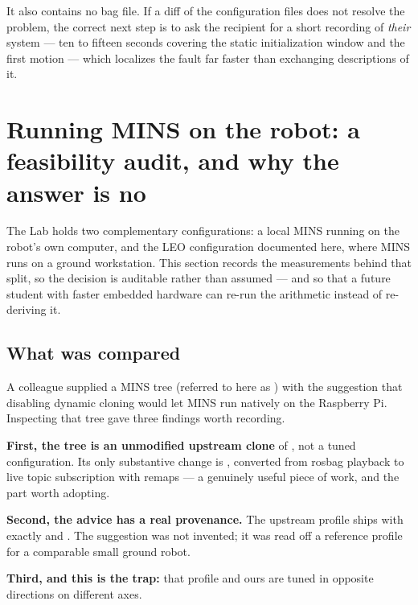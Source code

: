 \noindent It also contains no bag file. If a diff of the configuration files
does not resolve the problem, the correct next step is to ask the recipient for
a short recording of \emph{their} system --- ten to fifteen seconds covering the
static initialization window and the first motion --- which localizes the fault
far faster than exchanging descriptions of it.



\section{Running MINS on the robot: a feasibility audit, and why the answer is no}
\label{ap:mins-embedded}

The Lab holds two complementary configurations: a local MINS running on the
robot's own computer, and the LEO configuration documented here, where MINS
runs on a ground workstation. This section records the measurements behind
that split, so the decision is auditable rather than assumed --- and so that a
future student with faster embedded hardware can re-run the arithmetic instead
of re-deriving it.

\subsection{What was compared}

A colleague supplied a MINS tree (referred to here as ) with the
suggestion that disabling dynamic cloning would let MINS run natively on the
Raspberry Pi. Inspecting that tree gave three findings worth recording.

\noindent \textbf{First, the tree is an unmodified upstream clone} of
, not a tuned configuration. Its only substantive change is
, converted from rosbag playback to live
topic subscription with remaps --- a genuinely useful piece of work, and the
part worth adopting.

\noindent \textbf{Second, the advice has a real provenance.} The upstream
 profile ships with exactly  and
. The suggestion was not invented; it was read
off a reference profile for a comparable small ground robot.

\noindent \textbf{Third, and this is the trap:} that profile and ours are tuned
in opposite directions on different axes.

